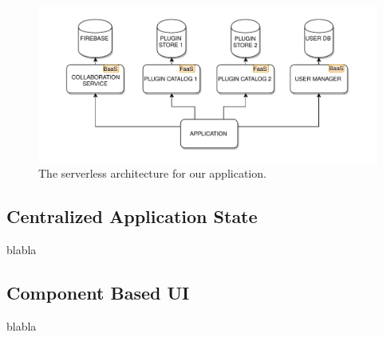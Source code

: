 \begin{figure}[htb]
\centering
\includegraphics[width=\linewidth]{contents/images/serverless-diagram}

\caption{The serverless architecture for our application.}
\label{fig_serverless}
\end{figure}



\subsection{Centralized Application State}\label{ssub:centr_state}

blabla

\subsection{Component Based UI}


blabla